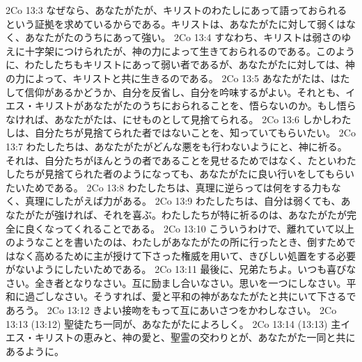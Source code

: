 2Co 13:3  なぜなら、あなたがたが、キリストのわたしにあって語っておられるという証拠を求めているからである。キリストは、あなたがたに対して弱くはなく、あなたがたのうちにあって強い。
2Co 13:4  すなわち、キリストは弱さのゆえに十字架につけられたが、神の力によって生きておられるのである。このように、わたしたちもキリストにあって弱い者であるが、あなたがたに対しては、神の力によって、キリストと共に生きるのである。
2Co 13:5  あなたがたは、はたして信仰があるかどうか、自分を反省し、自分を吟味するがよい。それとも、イエス・キリストがあなたがたのうちにおられることを、悟らないのか。もし悟らなければ、あなたがたは、にせものとして見捨てられる。
2Co 13:6  しかしわたしは、自分たちが見捨てられた者ではないことを、知っていてもらいたい。
2Co 13:7  わたしたちは、あなたがたがどんな悪をも行わないようにと、神に祈る。それは、自分たちがほんとうの者であることを見せるためではなく、たといわたしたちが見捨てられた者のようになっても、あなたがたに良い行いをしてもらいたいためである。
2Co 13:8  わたしたちは、真理に逆らっては何をする力もなく、真理にしたがえば力がある。
2Co 13:9  わたしたちは、自分は弱くても、あなたがたが強ければ、それを喜ぶ。わたしたちが特に祈るのは、あなたがたが完全に良くなってくれることである。
2Co 13:10  こういうわけで、離れていて以上のようなことを書いたのは、わたしがあなたがたの所に行ったとき、倒すためではなく高めるために主が授けて下さった権威を用いて、きびしい処置をする必要がないようにしたいためである。
2Co 13:11  最後に、兄弟たちよ。いつも喜びなさい。全き者となりなさい。互に励まし合いなさい。思いを一つにしなさい。平和に過ごしなさい。そうすれば、愛と平和の神があなたがたと共にいて下さるであろう。
2Co 13:12  きよい接吻をもって互にあいさつをかわしなさい。
2Co 13:13  (13:12) 聖徒たち一同が、あなたがたによろしく。
2Co 13:14  (13:13) 主イエス・キリストの恵みと、神の愛と、聖霊の交わりとが、あなたがた一同と共にあるように。


